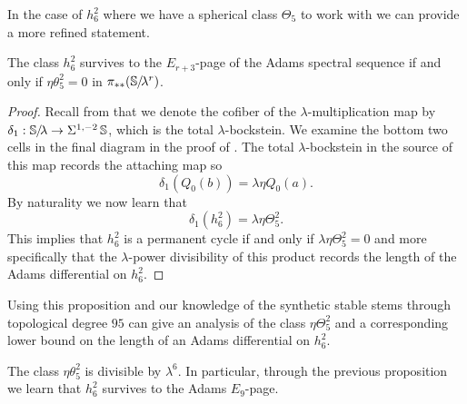 In the case of $h_6^2$ where we have a spherical class $\Theta_5$ to work with we can provide a more refined statement.

\begin{prop}
  The class $h_6^2$ survives to the $E_{r+3}$-page of the Adams spectral sequence if and only if $\eta\theta_5^2 = 0$ in $\pi_{**}(\operatorname{\mathbb{S}}\hspace{-2.2pt}/\!\lambda^{r})$. 
\end{prop}

\begin{proof}
  Recall from  that we denote the cofiber of the $\lambda$-multiplication map by $\delta_1:\operatorname{\mathbb{S}}\hspace{-2.2pt}/\!\lambda \rightarrow \Sigma^{1, -2} \operatorname{\mathbb{S}} $, which is the total $\lambda$-bockstein.
   We examine the bottom two cells in the final diagram in the proof of .
  The total $\lambda$-bockstein in the source of this map records the attaching map so
  \[ \delta_1(Q_0(b)) = \lambda \eta Q_0(a). \]
  By naturality we now learn that
  \[ \delta_1(h_6^2) = \lambda \eta \Theta_5^2. \]
  This implies that $h_6^2$ is a permanent cycle if and only if $\lambda \eta \Theta_5^2 = 0$ and more specifically that the $\lambda$-power divisibility of this product records the length of the Adams differential on $h_6^2$.

\end{proof}

  
Using this proposition and our knowledge of the synthetic stable stems through topological degree $95$ can give an analysis of the class $\eta \Theta_5^2$ and a corresponding lower bound on the length of an Adams differential on $h_6^2$.

\begin{thm}
  The class $\eta \theta_5^2$ is divisible by $\lambda^6$. In particular, through the previous proposition we learn that $h_6^2$ survives to the Adams $E_9$-page.
\end{thm}


